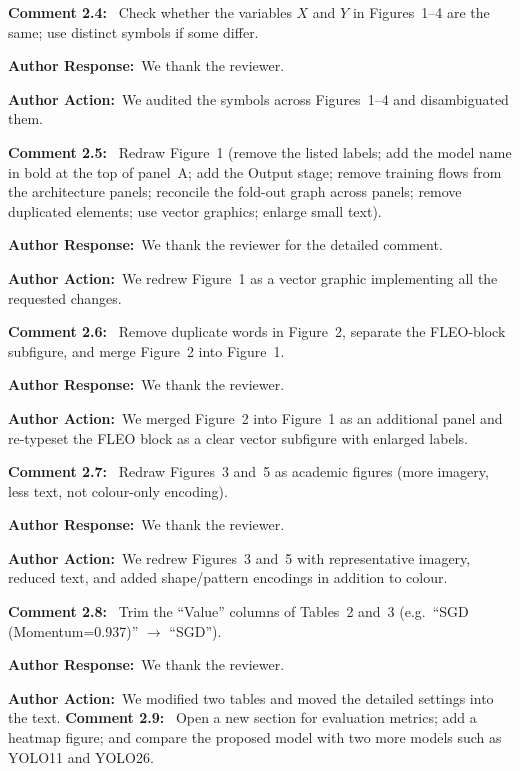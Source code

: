 \documentclass[11pt]{article}
\newcommand{\comment}[1]{\smallskip\noindent\textbf{\color{navy}Comment #1:}\ }
\newcommand{\response}{\smallskip\par\noindent\textbf{\color{steel}Author Response:}\ }
\newcommand{\action}{\smallskip\par\noindent\textbf{\color{steel}Author Action:}\ }
\begin{document}
\comment{2.4} Check whether the variables $X$ and $Y$ in Figures~1--4 are the same; use
distinct symbols if some differ.
\response We thank the reviewer.
\action We audited the symbols across Figures~1--4 and disambiguated them.

\comment{2.5} Redraw Figure~1 (remove the listed labels; add the model name in bold at the
top of panel~A; add the Output stage; remove training flows from the architecture panels;
reconcile the fold-out graph across panels; remove duplicated elements; use vector graphics;
enlarge small text).
\response We thank the reviewer for the detailed comment.
\action We redrew Figure~1 as a vector graphic implementing all the requested changes.

\comment{2.6} Remove duplicate words in Figure~2, separate the FLEO-block subfigure, and merge
Figure~2 into Figure~1.
\response We thank the reviewer.
\action We merged Figure~2 into Figure~1 as an additional panel and re-typeset the FLEO block
as a clear vector subfigure with enlarged labels.

\comment{2.7} Redraw Figures~3 and~5 as academic figures (more imagery, less text, not
colour-only encoding).
\response We thank the reviewer.
\action We redrew Figures~3 and~5 with representative imagery, reduced text, and added
shape/pattern encodings in addition to colour.

\comment{2.8} Trim the ``Value'' columns of Tables~2 and~3 (e.g.\ ``SGD (Momentum=0.937)''
$\rightarrow$ ``SGD'').
\response We thank the reviewer.
\action We modified two tables and moved the detailed settings into the text.
\comment{2.9} Open a new section for evaluation metrics; add a heatmap figure; and compare the
proposed model with two more models such as YOLO11 and YOLO26.
\end{document}
